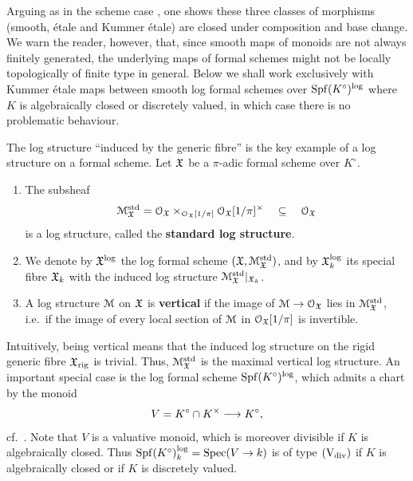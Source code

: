 Arguing as in the scheme case \cite[\S 3.5]{AHLS-Log}, one shows these three classes of morphisms (smooth, \'etale and Kummer \'etale) are closed under composition and base change. We warn the reader, however, that, since smooth maps of monoids are not always finitely generated,  the underlying maps of formal schemes might not be locally topologically of finite type in general. Below we shall work exclusively with Kummer \'etale maps between smooth log formal schemes over $\operatorname{Spf}(K^\circ)^{\rm log}$ where $K$ is algebraically closed or discretely valued, in which case there is no problematic behaviour. 

\begin{defi} \label{def:std-log-str}
    The log structure ``induced by the generic fibre'' is the key example of a log structure on a formal scheme.
    Let ${\mathfrak{X}}$ be a $\pi$-adic formal scheme over $K^\circ$. 
    \begin{enumerate}
        \item The subsheaf
        \[ 
            {\mathcal M}_{\mathfrak{X}}^{\rm std} = {\mathcal O}_{\mathfrak{X}} \times_{{\mathcal O}_{\mathfrak{X}}[1/\pi]} {\mathcal O}_{\mathfrak{X}}[1/\pi]^\times \quad\subseteq\quad {\mathcal O}_{\mathfrak{X}}
        \]
        is a log structure, called the {\bf standard log structure}.
        \item We denote by ${\mathfrak{X}}^{\rm log}$ the log formal scheme $({\mathfrak{X}}, {\mathcal M}_{\mathfrak{X}}^{\rm std})$, and by ${\mathfrak{X}}^{\rm log}_k$ its special fibre ${\mathfrak{X}}_k$ with the induced log structure ${\mathcal M}_{\mathfrak{X}}^{\rm std}|_{{\mathfrak{X}}_k}$. 
        \item A log structure ${\mathcal M}$ on ${\mathfrak{X}}$ is {\bf vertical} if the image of ${\mathcal M}\to{\mathcal O}_{\mathfrak{X}}$ lies in ${\mathcal M}_{\mathfrak{X}}^{\rm std}$, i.e.\ if the image of every local section of ${\mathcal M}$ in ${\mathcal O}_{\mathfrak{X}}[1/\pi]$ is invertible.
    \end{enumerate}
\end{defi}

Intuitively, being vertical means that the induced log structure on the rigid generic fibre ${\mathfrak{X}}_{\rm rig}$ is trivial.  Thus, ${\mathcal M}_{\mathfrak{X}}^{\rm std}$ is the maximal vertical log structure. An important special case is the log formal scheme $\operatorname{Spf}(K^\circ)^{\rm log}$, which admits a chart by the monoid 
    \[
        V = K^\circ \cap K^\times \longrightarrow K^\circ,
    \]
    cf.\ \cite[Lemma~4.4.1]{AHLS-Log}. Note that $V$ is a valuative monoid, which is moreover divisible if $K$ is algebraically closed. Thus $\operatorname{Spf}(K^\circ)_k^{\rm log} = \operatorname{Spec}(V\to k)$ is of type $(\mathrm{V}_{\rm div})$ if $K$ is algebraically closed or if $K$ is discretely valued.

